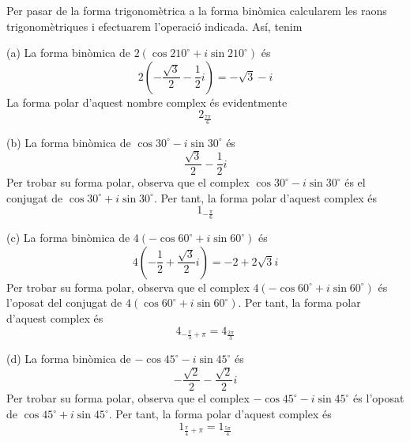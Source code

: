 \begin{solucio}
Per pasar de la forma trigonomètrica a la forma binòmica
calcularem les raons trigonomètriques i efectuarem l’operació
indicada. Así, tenim

(a) La forma binòmica de $2(\cos 210
^{\circ}
+i\sin 210
^{\circ}
)$ és
\begin{equation*}
2\left( -\frac{\sqrt{3}}{2}-\frac{1}{2}i\right) =-\sqrt{3}-i
\end{equation*}
La forma polar d’aquest nombre complex és evidentmente
\begin{equation*}
2_{\frac{7\pi }{6}}
\end{equation*}

(b) La forma binòmica de $\cos 30
^{\circ}
-i\sin 30
^{\circ}
$ és
\begin{equation*}
\frac{\sqrt{3}}{2}-\frac{1}{2}i
\end{equation*}
Per trobar su forma polar, observa que el complex $\cos 30
^{\circ}
-i\sin 30
^{\circ}
$ és el conjugat de $\cos 30
^{\circ}
+i\sin 30
^{\circ}
$. Per tant, la forma polar d’aquest complex és
\begin{equation*}
1_{-\frac{\pi }{6}}
\end{equation*}

(c) La forma binòmica de $4(-\cos 60
^{\circ}
+i\sin 60
^{\circ}
)$ és
\begin{equation*}
4\left( -\frac{1}{2}+\frac{\sqrt{3}}{2}i\right) =-2+2\sqrt{3}i
\end{equation*}
Per trobar su forma polar, observa que el complex $4(-\cos 60
^{\circ}
+i\sin 60
^{\circ}
)$ és l’oposat del conjugat de $4(\cos 60
^{\circ}
+i\sin 60
^{\circ}
)$. Per tant, la forma polar d’aquest complex és
\begin{equation*}
4_{-\frac{\pi }{3}+\pi }=4_{\frac{2\pi }{3}}
\end{equation*}

(d) La forma binòmica de $-\cos 45
^{\circ}
-i\sin 45
^{\circ}
$ és
\begin{equation*}
-\frac{\sqrt{2}}{2}-\frac{\sqrt{2}}{2}i
\end{equation*}
Per trobar su forma polar, observa que el complex $-\cos 45
^{\circ}
-i\sin 45
^{\circ}
$ és l’oposat de $\cos 45
^{\circ}
+i\sin 45
^{\circ}
$. Per tant, la forma polar d’aquest complex és
\begin{equation*}
1_{\frac{\pi }{4}+\pi }=1_{\frac{5\pi }{4}}
\end{equation*}
\end{solucio}

